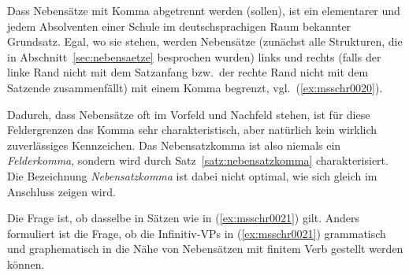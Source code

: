 \label{sec:nebensatzschreib}

Dass Nebensätze mit Komma abgetrennt werden (sollen), ist ein elementarer und jedem Absolventen einer Schule im deutschsprachigen Raum bekannter Grundsatz.
Egal, wo sie stehen, werden Nebensätze (zunächst alle Strukturen, die in Abschnitt~\ref{sec:nebensaetze} besprochen wurden) links und rechts (falls der linke Rand nicht mit dem Satzanfang bzw.\ der rechte Rand nicht mit dem Satzende zusammenfällt) mit einem Komma begrenzt, vgl.\ (\ref{ex:msschr0020}).

\begin{exe}
  \ex\label{ex:msschr0020} 
  \begin{xlist}
  \end{xlist}
\end{exe}

Dadurch, dass Nebensätze oft im Vorfeld und Nachfeld stehen, ist für diese Feldergrenzen das Komma sehr charakteristisch, aber natürlich kein wirklich zuverlässiges Kennzeichen.
Das Nebensatzkomma ist also niemals ein \textit{Felderkomma}, sondern wird durch Satz~\ref{satz:nebensatzkomma} charakterisiert.
Die Bezeichnung \textit{Nebensatzkomma} ist dabei nicht optimal, wie sich gleich im Anschluss zeigen wird.


Die Frage ist, ob dasselbe in Sätzen wie in (\ref{ex:msschr0021}) gilt.
Anders formuliert ist die Frage, ob die Infinitiv-VPs in (\ref{ex:msschr0021}) grammatisch und graphematisch in die Nähe von Nebensätzen mit finitem Verb gestellt werden können.

\begin{exe}
  \ex\label{ex:msschr0021} 
  \begin{xlist}
  \end{xlist}
\end{exe}

